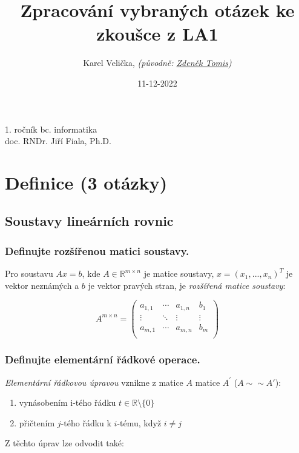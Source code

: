 \documentclass[10pt,a4paper]{article}
\title{Zpracování vybraných otázek ke zkoušce z LA1}
\date{11-12-2022}
\author{Karel Velička, \textit{(původně: \href{https://github.com/zdenecek/mff_stuff/tree/master/linearni_algebra_1/prednaska_fiala_1}{Zdeněk Tomis})}}
\begin{document}
\maketitle

\begin{center}
    1. ročník bc. informatika\\ doc. RNDr. Jiří Fiala, Ph.D.
\end{center}

\tableofcontents

\newpage
{}

\section{Definice (3 otázky)}
\subsection{Soustavy lineárních rovnic}
\subsubsection{Definujte rozšířenou matici soustavy.}

Pro soustavu $Ax = b$, kde $A \in \mathbb{R}^{m \times n}$ je matice soustavy, $x = (x_1, ..., x_n)^T$ je vektor neznámých a $b$ je vektor pravých stran, je \textit{rozšířená matice soustavy}:

\[A^{m\times n} =
\left(\begin{array}{ccc|c}
        a_{1,1} & \dotsb  & a_{1,n} & b_1\\
      \vdots & \ddots & \vdots & \vdots\\
      a_{m,1} & \dotsb & a_{m,n} & b_m\\
\end{array}\right)
\]

\subsubsection{Definujte elementární řádkové operace.}

\textit{Elementární řádkovou úpravou} vznikne z matice $A$ matice $A^\prime$ ($A \sim \sim A'$):

\begin{enumerate}[label=(\roman*)]
    \item vynásobením i-tého řádku $t \in \mathbb{R} \setminus \{0\}$
\item přičtením $j$-tého řádku k $i$-tému, když $i \neq j$
\end{enumerate}
Z těchto úprav lze odvodit také:
\end{document}
